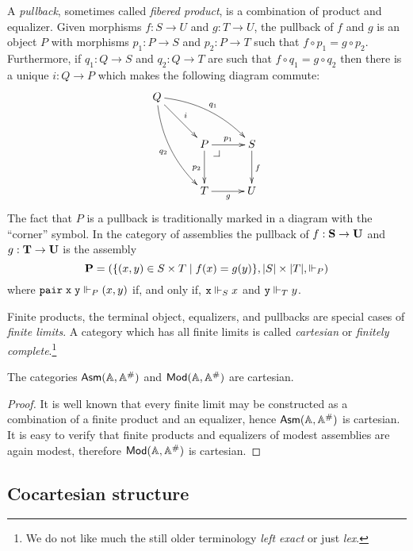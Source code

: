 A \emph{pullback}, sometimes called \emph{fibered product}, is a
combination of product and equalizer. Given morphisms $f : S \to U$
and $g : T \to U$, the pullback of $f$ and $g$ is an object $P$ with
morphisms $p_1 : P \to S$ and $p_2 : P \to T$ such that $f \circ p_1 =
g \circ p_2$. Furthermore, if $q_1 : Q \to S$ and $q_2 : Q \to T$ are
such that $f \circ q_1 = g \circ q_2$ then there is a unique $i : Q
\to P$ which makes the following diagram commute:
%
\begin{equation*}
  \xymatrix@+0.5em{
    {Q}
    \ar[dr]^{i}
    \ar@/_1em/[ddr]_{q_2}
    \ar@/^1em/[rrd]^{q_1}
    &
    &
    \\
    &
    {P} \pbcorner
    \ar[r]^{p_1}
    \ar[d]_{p_2}
    &
    {S}
    \ar[d]^{f}
    \\
    &
    {T}
    \ar[r]_{g}
    &
    {U}
  }
\end{equation*}
%
The fact that $P$ is a pullback is traditionally marked in a diagram
with the ``corner'' symbol. In the category of assemblies the pullback
of $f : \mathbf{S} \to \mathbf{U}$ and $g : \mathbf{T} \to \mathbf{U}$ is the
assembly
%
\begin{equation*}
  \mathbf{P} = (\{(x,y) \in S \times T \mid f(x) = g(y)\}, |S| \times
  |T|, {\Vdash_P})
\end{equation*}
%
where $\mathtt{pair}\;\mathtt{x}\;\mathtt{y} \Vdash_P (x,y)$ if, and only if, $\mathtt{x}
\Vdash_S x$ and $\mathtt{y} \Vdash_T y$.

Finite products, the terminal object, equalizers, and pullbacks are
special cases of \emph{finite limits}. A category which has all finite
limits is called \emph{cartesian} or \emph{finitely
  complete}.\footnote{We do not like much the still older terminology
  \emph{left exact} or just \emph{lex}.}

\begin{proposition}
  \label{prop:asm-cartesian}%
  The categories $\mathsf{Asm}(\mathbb{A},\mathbb{A}^{\#})$ and $\mathsf{Mod}(\mathbb{A}, \mathbb{A}^{\#})$ are cartesian.
\end{proposition}

\begin{proof}
  It is well known that every finite limit may be constructed as a
  combination of a finite product and an equalizer, hence $\mathsf{Asm}(\mathbb{A},\mathbb{A}^{\#})$ is
  cartesian. It is easy to verify that finite products and equalizers
  of modest assemblies are again modest, therefore $\mathsf{Mod}(\mathbb{A},
    \mathbb{A}^{\#})$ is cartesian.
\end{proof}


\subsection{Cocartesian structure}
\label{sec:cocartesian-structure}


